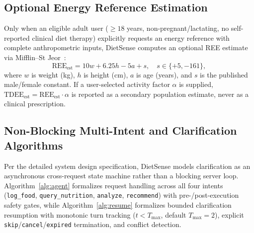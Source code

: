 \documentclass[conference]{IEEEtran}
\begin{document}
\subsection{Optional Energy Reference Estimation}
Only when an eligible adult user ($\ge 18$ years, non-pregnant/lactating, no self-reported clinical diet therapy) explicitly requests an energy reference with complete anthropometric inputs, DietSense computes an optional REE estimate via Mifflin--St Jeor~\cite{mifflin1990ree}:
\begin{equation}
\text{REE}_{\text{est}} = 10 w + 6.25 h - 5 a + s, \quad s \in \{+5, -161\},
\label{eq:mifflin}
\end{equation}
where $w$ is weight (kg), $h$ is height (cm), $a$ is age (years), and $s$ is the published male/female constant. If a user-selected activity factor $\alpha$ is supplied, $\text{TDEE}_{\text{est}} = \text{REE}_{\text{est}} \cdot \alpha$ is reported as a secondary population estimate, never as a clinical prescription.

\subsection{Non-Blocking Multi-Intent and Clarification Algorithms}
Per the detailed system design specification, DietSense models clarification as an asynchronous cross-request state machine rather than a blocking server loop. Algorithm~\ref{alg:agent} formalizes request handling across all four intents (\texttt{log\_food}, \texttt{query\_nutrition}, \texttt{analyze}, \texttt{recommend}) with pre-/post-execution safety gates, while Algorithm~\ref{alg:resume} formalizes bounded clarification resumption with monotonic turn tracking ($t < T_{\max}$, default $T_{\max}=2$), explicit \texttt{skip}/\texttt{cancel}/\texttt{expired} termination, and conflict detection.
\end{document}
